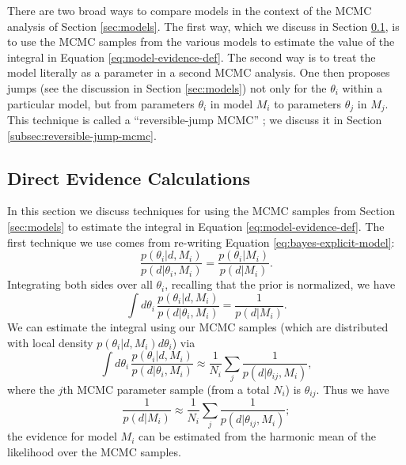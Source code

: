 \documentclass[preprint]{aastex}
\begin{document}
There are two broad ways to compare models in the context of the MCMC
analysis of Section \ref{sec:models}.  The first way, which we discuss
in Section \ref{subsec:direct-evidence}, is to use the MCMC samples
from the various models to estimate the value of the integral in
Equation \eqref{eq:model-evidence-def}.  The second way is to treat
the model literally as a parameter in a second MCMC analysis.  One
then proposes jumps (see the discussion in Section \ref{sec:models})
not only for the $\theta_i$ within a particular model, but from
parameters $\theta_i$ in model $M_i$ to parameters $\theta_j$ in
$M_j$.  This technique is called a ``reversible-jump MCMC''
\citep{Green1995}; we discuss it in Section
\ref{subsec:reversible-jump-mcmc}.

\subsection{Direct Evidence Calculations}
\label{subsec:direct-evidence}

In this section we discuss techniques for using the MCMC samples from
Section \ref{sec:models} to estimate the integral in Equation
\eqref{eq:model-evidence-def}.  The first technique we use comes from
re-writing Equation \eqref{eq:bayes-explicit-model}:
\begin{equation}
  \frac{p(\theta_i|d,M_i)}{p(d|\theta_i,M_i)} = \frac{p(\theta_i|M_i)}{p(d|M_i)}.
\end{equation}
Integrating both sides over all $\theta_i$, recalling that the prior
is normalized, we have 
\begin{equation}
  \int d\theta_i\, \frac{p(\theta_i|d,M_i)}{p(d|\theta_i,M_i)} = \frac{1}{p(d|M_i)}.
\end{equation}
We can estimate the integral using our MCMC samples (which are
distributed with local density $p(\theta_i|d,M_i)d\theta_i$) via
\begin{equation}
  \int d\theta_i\, \frac{p(\theta_i|d,M_i)}{p(d|\theta_i,M_i)} \approx
  \frac{1}{N_i} \sum_j \frac{1}{p(d|\theta_{ij}, M_i)},
\end{equation}
where the $j$th MCMC parameter sample (from a total $N_i$) is
$\theta_{ij}$.  Thus we have
\begin{equation}
  \frac{1}{p(d|M_i)} \approx \frac{1}{N_i} \sum_j \frac{1}{p(d|\theta_{ij}, M_i)};
\end{equation}
the evidence for model $M_i$ can be estimated from the harmonic mean
of the likelihood over the MCMC samples.  
\end{document}
